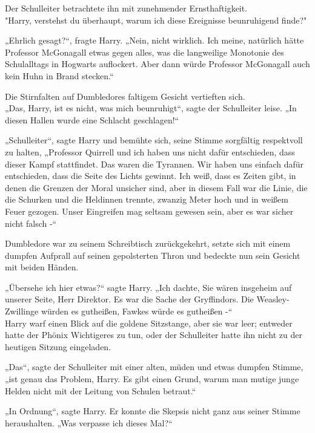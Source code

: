 {Der Schulleiter betrachtete ihn mit zunehmender Ernsthaftigkeit.\\ "Harry, verstehst du überhaupt, warum ich diese Ereignisse beunruhigend finde?"

„Ehrlich gesagt?“, fragte Harry. „Nein, nicht wirklich. Ich meine, natürlich hätte Professor McGonagall etwas gegen alles, was die langweilige Monotonie des Schulalltags in Hogwarts auflockert. Aber dann würde Professor McGonagall auch kein Huhn in Brand stecken.“

Die Stirnfalten auf Dumbledores faltigem Gesicht vertieften sich.\\ „Das, Harry, ist es nicht, was mich beunruhigt“, sagte der Schulleiter leise. „In diesen Hallen wurde eine Schlacht geschlagen!“

„Schulleiter“, sagte Harry und bemühte sich, seine Stimme sorgfältig respektvoll zu halten, „Professor Quirrell und ich haben uns nicht dafür entschieden, dass dieser Kampf stattfindet. Das waren die Tyrannen. Wir haben uns einfach dafür entschieden, dass die Seite des Lichts gewinnt. Ich weiß, dass es Zeiten gibt, in denen die Grenzen der Moral unsicher sind, aber in diesem Fall war die Linie, die die Schurken und die Heldinnen trennte, zwanzig Meter hoch und in weißem Feuer gezogen. Unser Eingreifen mag seltsam gewesen sein, aber es war sicher nicht falsch -“

Dumbledore war zu seinem Schreibtisch zurückgekehrt, setzte sich mit einem dumpfen Aufprall auf seinen gepolsterten Thron und bedeckte nun sein Gesicht mit beiden Händen.

„Übersehe ich hier etwas?“ sagte Harry. „Ich dachte, Sie wären insgeheim auf unserer Seite, Herr Direktor. Es war die Sache der Gryffindors. Die Weasley-Zwillinge würden es gutheißen, Fawkes würde es gutheißen -“\\ Harry warf einen Blick auf die goldene Sitzstange, aber sie war leer; entweder hatte der Phönix Wichtigeres zu tun, oder der Schulleiter hatte ihn nicht zu der heutigen Sitzung eingeladen.

„Das“, sagte der Schulleiter mit einer alten, müden und etwas dumpfen Stimme, „ist genau das Problem, Harry. Es gibt einen Grund, warum man mutige junge Helden nicht mit der Leitung von Schulen betraut.“

„In Ordnung“, sagte Harry. Er konnte die Skepsis nicht ganz aus seiner Stimme heraushalten. „Was verpasse ich dieses Mal?“

}
